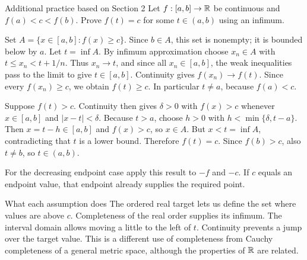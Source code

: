 \begin{exam}{Additional practice based on Section 2}
Let $f:[a,b]\to\mathbb R$ be continuous and $f(a)<c<f(b)$. Prove $f(t)=c$ for some $t\in(a,b)$ using an infimum.
\end{exam}
\begin{answer}
Set $A=\{x\in[a,b]:f(x)\ge c\}$. Since $b\in A$, this set is nonempty; it is bounded below by $a$. Let $t=\inf A$. By infimum approximation choose $x_n\in A$ with $t\le x_n<t+1/n$. Thus $x_n\to t$, and since all $x_n\in[a,b]$, the weak inequalities pass to the limit to give $t\in[a,b]$. Continuity gives $f(x_n)\to f(t)$. Since every $f(x_n)\ge c$, we obtain $f(t)\ge c$. In particular $t\ne a$, because $f(a)<c$.

Suppose $f(t)>c$. Continuity then gives $\delta>0$ with $f(x)>c$ whenever $x\in[a,b]$ and $|x-t|<\delta$. Because $t>a$, choose $h>0$ with $h<\min\{\delta,t-a\}$. Then $x=t-h\in[a,b]$ and $f(x)>c$, so $x\in A$. But $x<t=\inf A$, contradicting that $t$ is a lower bound. Therefore $f(t)=c$. Since $f(b)>c$, also $t\ne b$, so $t\in(a,b)$.

For the decreasing endpoint case apply this result to $-f$ and $-c$. If $c$ equals an endpoint value, that endpoint already supplies the required point.
\end{answer}
\begin{note}{What each assumption does}
The ordered real target lets us define the set where values are above $c$. Completeness of the real order supplies its infimum. The interval domain allows moving a little to the left of $t$. Continuity prevents a jump over the target value. This is a different use of completeness from Cauchy completeness of a general metric space, although the properties of $\mathbb R$ are related.
\end{note}


